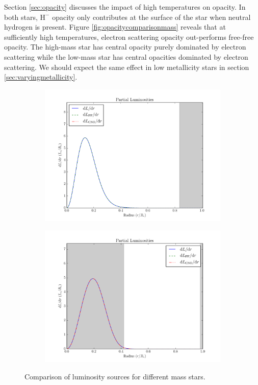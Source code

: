 \documentclass[11pt]{article}
\begin{document}
    Section \ref{sec:opacity} discusses the impact of high temperatures on opacity. In both stars, $\text{H}^-$ opacity only contributes at the surface of the star when neutral hydrogen is present. Figure \ref{fig:opacitycomparisonmass} reveals that at sufficiently high temperatures, electron scattering opacity out-performs free-free opacity. The high-mass star has central opacity purely dominated by electron scattering while the low-mass star has central opacities dominated by electron scattering. We should expect the same effect in low metallicity stars in section \eqref{sec:varyingmetallicity}.
    \begin{center}
        \begin{figure}[H]
            \begin{subfigure}{.5\textwidth}
                \centering
                \includegraphics[width=1.1\textwidth]{figures/lowmass/partial_lumin.pdf}
            \end{subfigure}
            \begin{subfigure}{.5\textwidth}
                \centering
                \includegraphics[width=1.1\textwidth]{figures/highmass/partial_lumin.pdf}
            \end{subfigure}
            \caption{Comparison of luminosity sources for different mass stars.}
            \label{fig:luminositycomparisonmass}
        \end{figure}
    \end{center}
\end{document}
